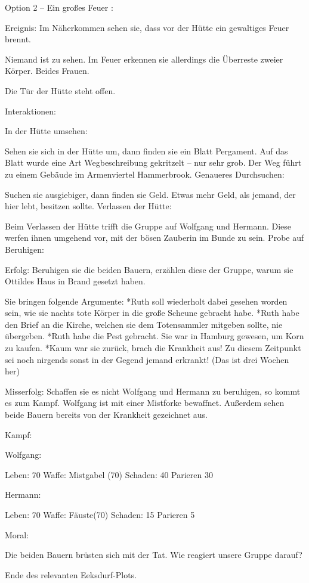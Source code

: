 Option 2 – Ein großes Feuer
:

Ereignis: Im Näherkommen sehen sie, dass vor der Hütte ein gewaltiges Feuer brennt.

Niemand ist zu sehen. Im Feuer erkennen sie allerdings die Überreste zweier Körper. Beides Frauen.

Die Tür der Hütte steht offen.

Interaktionen:

In der Hütte umsehen:

Sehen sie sich in der Hütte um, dann finden sie ein Blatt Pergament. Auf das Blatt wurde eine Art Wegbeschreibung gekritzelt – nur sehr grob. Der Weg führt zu einem Gebäude im Armenviertel Hammerbrook.
Genaueres Durchsuchen:

Suchen sie ausgiebiger, dann finden sie Geld. Etwas mehr Geld, als jemand, der hier lebt, besitzen sollte.
Verlassen der Hütte:

Beim Verlassen der Hütte trifft die Gruppe auf Wolfgang und Hermann. Diese werfen ihnen umgehend vor, mit der bösen Zauberin im Bunde zu sein.
Probe auf Beruhigen:

Erfolg: Beruhigen sie die beiden Bauern, erzählen diese der Gruppe, warum sie Ottildes Haus in Brand gesetzt haben.

Sie bringen folgende Argumente:
*Ruth soll wiederholt dabei gesehen worden sein, wie sie nachts tote Körper in die große Scheune gebracht habe.
*Ruth habe den Brief an die Kirche, welchen sie dem Totensammler mitgeben sollte, nie übergeben.
*Ruth habe die Pest gebracht. Sie war in Hamburg gewesen, um Korn zu kaufen.
*Kaum war sie zurück, brach die Krankheit aus! Zu diesem Zeitpunkt sei noch nirgends sonst in der Gegend jemand erkrankt! (Das ist drei Wochen her)

Misserfolg: Schaffen sie es nicht Wolfgang und Hermann zu beruhigen, so kommt es zum Kampf.
Wolfgang ist mit einer Mistforke bewaffnet. Außerdem sehen beide Bauern bereits von der Krankheit gezeichnet aus.

Kampf:

Wolfgang:

Leben: 70
Waffe: Mistgabel (70)
Schaden: 40
Parieren 30

Hermann:

Leben: 70
Waffe: Fäuste(70)
Schaden: 15
Parieren 5

Moral:

Die beiden Bauern brüsten sich mit der Tat. Wie reagiert unsere Gruppe darauf?


Ende des relevanten Eeksdurf-Plots.
